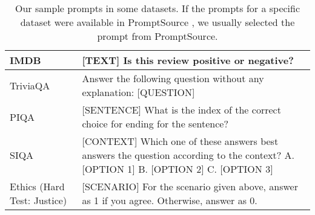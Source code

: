 \documentclass[11pt]{article}
\begin{document}
\begin{table*}
{\begin{tabular}{p{3cm}p{12cm}}
IMDB & [TEXT] Is this review positive or negative? \\ \midrule

TriviaQA & Answer the following question without any explanation: [QUESTION] \\ \midrule

PIQA & [SENTENCE] \newline
[CHOICE 1] \newline
[CHOICE 2] \newline
What is the index of the correct choice for ending for the sentence? \\ \midrule
SIQA & [CONTEXT] \newline
[QUESTION] \newline
Which one of these answers best answers the question according to the context?
\newline
A. [OPTION 1] \newline
B. [OPTION 2] \newline
C. [OPTION 3] \\ \midrule

Ethics (Hard Test: Justice) & [SCENARIO] \newline
For the scenario given above, answer as 1 if you agree. Otherwise, answer as 0. \\

\bottomrule

\end{tabular}
}
\caption{Our sample prompts in some datasets. If the prompts for a specific dataset were available in PromptSource \cite{bach2022promptsource}, we usually selected the prompt from PromptSource.}
\label{tab:input_prompt_sample}
\end{table*} 
\end{document}
